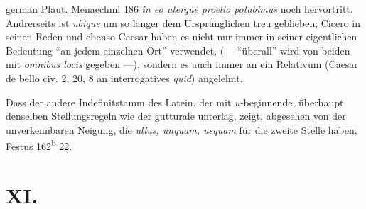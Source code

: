 \begin{otherlanguage*}{german}
Plaut. Menaechmi 186 \emph{in eo uterque proelio potabimus} noch hervortritt. Andrerseits ist \emph{ubique} um so länger dem Ursprünglichen treu geblieben; Cicero in seinen Reden und ebenso Caesar haben es nicht nur immer in seiner eigentlichen Bedeutung “an jedem einzelnen Ort” verwendet, (— “überall” wird von beiden mit \emph{omnibus locis} gegeben —), sondern es auch immer an ein Relativum (Caesar de bello civ. 2, 20, 8 an interrogatives \emph{quid}) angelehnt.

Dass der andere Indefinitstamm des Latein, der mit \emph{u-}beginnende, überhaupt denselben Stellungsregeln wie der gutturale unterlag, zeigt, abgesehen von der unverkennbaren Neigung, die \emph{ullus, unquam, usquam} für die zweite Stelle haben, Festus 162\textsuperscript{b} 22.

\section*{XI.}


\end{otherlanguage*}
